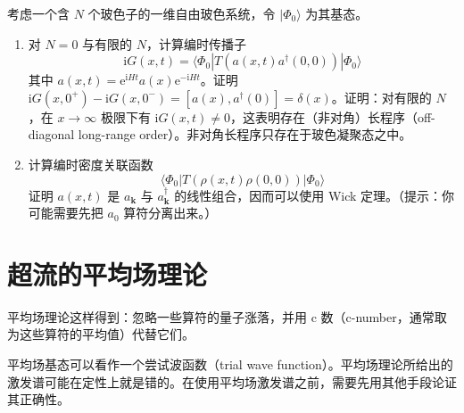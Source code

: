 考虑一个含 $N$ 个玻色子的一维自由玻色系统，令 $|\Phi_0\rangle$ 为其基态。
\begin{enumerate}
\item 对 $N=0$ 与有限的 $N$，计算编时传播子
\begin{equation*}
\mathrm{i}G(x,t)=\langle\Phi_0|T(a(x,t)a^{\dagger}(0,0))|\Phi_0\rangle
\end{equation*}
其中 $a(x,t)=\mathrm{e}^{\mathrm{i}Ht}a(x)\mathrm{e}^{-\mathrm{i}Ht}$。证明 $\mathrm{i}G(x,0^{+})-\mathrm{i}G(x,0^{-})=[a(x),a^{\dagger}(0)]=\delta(x)$。证明：对有限的 $N$，在 $x\to\infty$ 极限下有 $\mathrm{i}G(x,t)\neq0$，这表明存在（非对角）长程序（off-diagonal long-range order）。非对角长程序只存在于玻色凝聚态之中。
\item 计算编时密度关联函数
\begin{equation*}
\langle\Phi_0|T(\rho(x,t)\rho(0,0))|\Phi_0\rangle
\end{equation*}
证明 $a(x,t)$ 是 $a_{\pmb{k}}$ 与 $a_{\pmb{k}}^{\dagger}$ 的线性组合，因而可以使用 Wick 定理。（提示：你可能需要先把 $a_0$ 算符分离出来。）
\end{enumerate}

\section{超流的平均场理论}

\begin{keypoints}
\item 平均场理论这样得到：忽略一些算符的量子涨落，并用 c 数（c-number，通常取为这些算符的平均值）代替它们。
\item 平均场基态可以看作一个尝试波函数（trial wave function）。平均场理论所给出的激发谱可能在定性上就是错的。在使用平均场激发谱之前，需要先用其他手段论证其正确性。
\end{keypoints}

